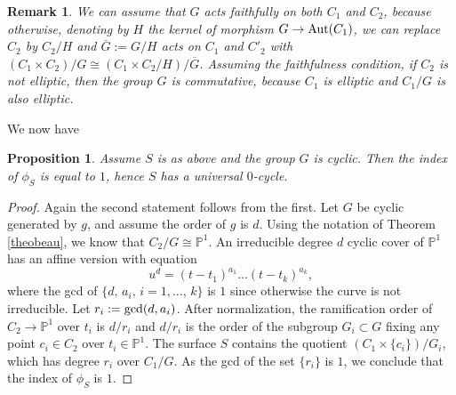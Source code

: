 \documentclass[10pt]{article}
\newtheorem{prop}[theo]{Proposition}
\newtheorem{rema}[theo]{Remark}
\begin{document}
\begin{rema}{\rm We can assume that $G$ acts faithfully on both $C_1$ and $C_2$, because otherwise, denoting by
$H$ the kernel of morphism $G\rightarrow {\rm Aut}(C_1)$, we can replace $C_2$ by $C_2/H$ and $\overline{G}:=G/H$ acts on $C_1$ and $C'_2$ with $(C_1\times C_2)/G\cong (C_1\times C_2/H)/\overline{G}$. Assuming the faithfulness condition, if $C_2$ is not elliptic, then the group $G$ is commutative, because $C_1$ is elliptic and $C_1/G$ is also elliptic.}
\end{rema}
We now have
\begin{prop}\label{prosurfcascyclique} Assume $S$ is  as above and the group $G$ is cyclic. Then the index of $\phi_S$ is equal to $1$, hence $S$ has a universal $0$-cycle.
\end{prop}
\begin{proof} Again the second statement follows from the first. Let $G$ be cyclic generated by $g$, and assume the order of $g$ is $d$. Using the notation of Theorem \ref{theobeau}, we know that
$C_2/G\cong\mathbb{P}^1$. An irreducible degree $d$ cyclic cover of $\mathbb{P}^1$  has an affine version with  equation
$$ u^d=(t-t_1)^{a_1}\ldots (t-t_k)^{a_k},$$
where the gcd of $\{d,\,a_i,\,i=1,\ldots,\,k\}$ is $1$ since otherwise the curve is not irreducible. Let $r_i:={\rm gcd}(d,a_i)$. After normalization, the ramification order of $C_2\rightarrow \mathbb{P}^1$ over $t_i$ is $d/r_i$ and $d/r_i$ is the order of
the subgroup $G_i\subset G$ fixing any point $c_i\in C_2$ over $t_i\in \mathbb{P}^1$. The surface $S$ contains the quotient $(C_1\times \{c_i\})/G_i$, which has degree $r_i$ over $C_1/G$. As the gcd of the  set $\{r_i\}$  is $1$, we conclude that the index of $\phi_S$ is $1$.
\end{proof}
\end{document}
